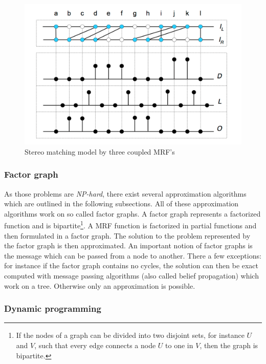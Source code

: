 \begin{figure}[h!]
  \centering
  \includegraphics[width=1.0\textwidth]{src/images/mrf-stereo-matching.png}
  \caption[Stereo matching model by three coupled MRF's]{Stereo matching model by three coupled MRF's\citep{sun2003stereo}}
  \label{fig:mrf-stereo-matching}
\end{figure}

\subsubsection{Factor graph}

\noindent As those problems are \textit{NP-hard}, there exist several approximation algorithms which are outlined in the following subsections.
All of these approximation algorithms work on so called factor graphs.
A factor graph represents a factorized function and is bipartite\footnote{If the nodes of a graph can be divided into two disjoint sets, for instance $U$ and $V$, such that every edge connects a node $U$ to one in $V$, then the graph is bipartite.}.
A MRF function is factorized in partial functions and then formulated in a factor graph.
The solution to the problem represented by the factor graph is then approximated.
An important notion of factor graphs is the message which can be passed from a node to another.
There a few exceptions: for instance if the factor graph contains no cycles, the solution can then be exact computed with message passing algorithms (also called belief propagation) which work on a tree.
Otherwise only an approximation is possible.

\subsubsection{Dynamic programming}

